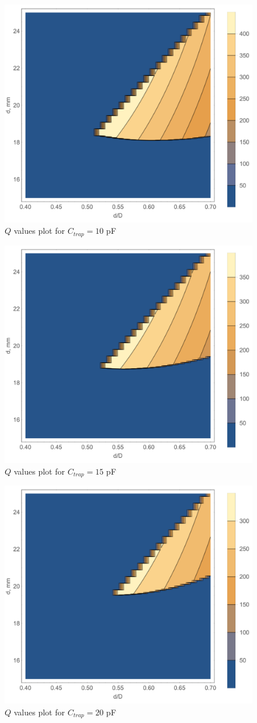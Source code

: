 \FloatBarrier
\begin{figure}[h!]
\centering
\includegraphics[width=.78\textwidth]{images/q_plot_siverns_tex_10}
\caption{$Q$ values plot for $C_{trap} = 10$ pF}
\label{fig:q_plot_10}
\end{figure}
\begin{figure}[h!]
\centering
\includegraphics[width=.78\textwidth]{images/q_plot_siverns_tex_15}
\caption{$Q$ values plot for $C_{trap} = 15$ pF}
\label{fig:q_plot_15}
\end{figure}
\begin{figure}[h!]
\centering
\includegraphics[width=.78\textwidth]{images/q_plot_siverns_tex_20}
\caption{$Q$ values plot for $C_{trap} = 20$ pF}
\label{fig:q_plot_20}
\end{figure}
